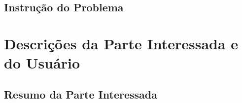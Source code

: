 \begin{anexosenv}
	\subsection{Instrução do Problema}


	\section{Descrições da Parte Interessada e do Usuário}

	\subsection{Resumo da Parte Interessada}


\end{anexosenv}
